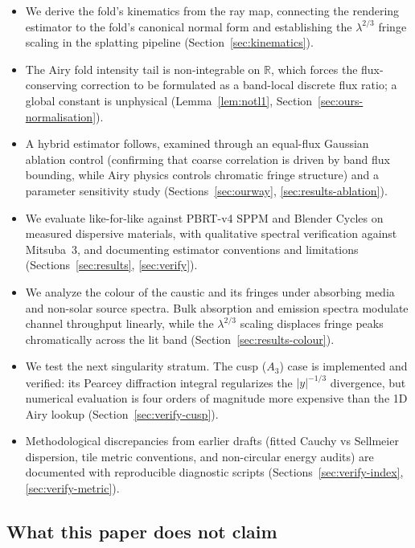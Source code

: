 \begin{itemize}
\item We derive the fold's kinematics from the ray map, connecting the rendering
      estimator to the fold's canonical normal form and establishing the
      $\lambda^{2/3}$ fringe scaling in the splatting pipeline (Section~\ref{sec:kinematics}).
\item The Airy fold intensity tail is non-integrable on $\mathbb{R}$, which forces
      the flux-conserving correction to be formulated as a band-local discrete flux ratio; a global constant is unphysical (Lemma~\ref{lem:notl1},
      Section~\ref{sec:ours-normalisation}).
\item A hybrid estimator follows, examined through an equal-flux Gaussian ablation
      control (confirming that coarse correlation is driven by band flux bounding,
      while Airy physics controls chromatic fringe structure) and a parameter sensitivity
      study (Sections~\ref{sec:ourway}, \ref{sec:results-ablation}).
\item We evaluate like-for-like against PBRT-v4 SPPM and Blender Cycles on measured
      dispersive materials, with qualitative spectral verification against Mitsuba~3,
      and documenting estimator conventions and limitations
      (Sections~\ref{sec:results}, \ref{sec:verify}).
\item We analyze the colour of the caustic and its fringes under absorbing media
      and non-solar source spectra. Bulk absorption and emission spectra modulate
      channel throughput linearly, while the $\lambda^{2/3}$ scaling displaces fringe
      peaks chromatically across the lit band (Section~\ref{sec:results-colour}).
\item We test the next singularity stratum. The cusp ($A_3$) case is implemented
      and verified: its Pearcey diffraction integral regularizes the $|y|^{-1/3}$
      divergence, but numerical evaluation is four orders of magnitude more expensive
      than the 1D Airy lookup (Section~\ref{sec:verify-cusp}).
\item Methodological discrepancies from earlier drafts (fitted Cauchy vs Sellmeier
      dispersion, tile metric conventions, and non-circular energy audits) are
      documented with reproducible diagnostic scripts (Sections~\ref{sec:verify-index},
      \ref{sec:verify-metric}).
\end{itemize}

\subsection{What this paper does not claim}
\label{sec:notclaimed}

